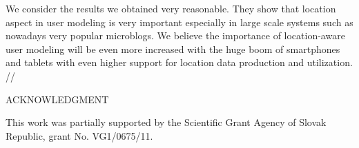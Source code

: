 \documentclass[a4, conference]{IEEEtran}
\begin{document}
We  consider  the  results  we  obtained  very  reasonable. They  show  that  location  aspect  in  user  modeling  is very important especially in large scale systems such as nowadays very  popular  microblogs.  We  believe  the  importance of location-aware  user  modeling  will  be  even  more  increased with  the  huge  boom of  smartphones  and  tablets  with even higher support for location data production and utilization. 
//

\begin{center}
ACKNOWLEDGMENT
\end{center}

This work was partially supported by the Scientific Grant Agency of Slovak Republic, grant No. VG1/0675/11.



\end{document}
